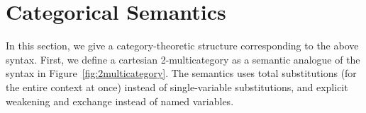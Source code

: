 \newcommand\cD{\ensuremath{\mathcal{D}}}
\newcommand\IndF[3]{\ensuremath{{#1}^\Fsymb_{{#2},{#3}}}}
\newcommand\IndU[4]{\ensuremath{{#1}^\Usymb_{{#2},{#3},{#4}}}}

\section{Categorical Semantics}
\label{sec:semantics}

In this section, we give a category-theoretic structure corresponding to
the above syntax.  First, we define a cartesian 2-multicategory as a
semantic analogue of the syntax in Figure~\ref{fig:2multicategory}. The
semantics uses total substitutions (for the entire context at once)
instead of single-variable substitutions, and explicit weakening and
exchange instead of named variables.

